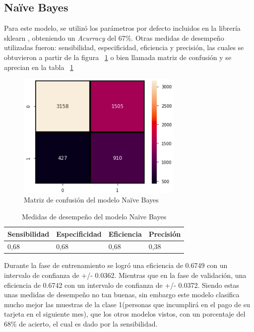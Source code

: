 \documentclass[conference]{IEEEtran}
\begin{document}
\subsection{Naïve Bayes}
Para este modelo, se utilizó los parámetros por defecto incluidos en la librería sklearn \cite{sklearnGaussian}, obteniendo un \textit{Acurracy} del 67\%. Otras medidas de desempeño utilizadas fueron: sensibilidad, especificidad, eficiencia y precisión, las cuales se obtuvieron a partir de la figura ~\ref{fig:confusionMatrizGNB} o bien llamada matriz de confusión y se aprecian en la tabla  ~\ref{tab:medidasGNB}
\begin{center}
    \begin{figure}[H]
        \hfill
     \centerline{\includegraphics[width=8cm]{matrixConfusionGNB.png}}
    \caption{Matriz de confusión del modelo Naïve Bayes}
    \label{fig:confusionMatrizGNB}
    \end{figure}  
\end{center}
\begin{table}[H]
\centering
\begin{tabular}{|l|l|l|l|}
\hline
Sensibilidad & Especificidad & \multicolumn{1}{r|}{Eficiencia} & Precisión \\ \hline
0,68         & 0,68          & 0,68                            & 0,38      \\ \hline
\end{tabular}
\caption{Medidas de desempeño del modelo Naïve Bayes}
\label{tab:medidasGNB}
\end{table}
Durante la fase de entrenamiento se logró una eficiencia de 0.6749 con un intervalo de confianza de +/- 0.0362. Mientras que en la fase de validación, una eficiencia de 0.6742 con un intervalo de confianza de +/-  0.0372. Siendo estas unas medidas de desempeño no tan buenas, sin embargo este modelo clasifica mucho mejor las muestras de la clase 1(personas que incumplirá en el pago de su tarjeta en el siguiente mes), que los otros modelos vistos, con un porcentaje del 68\% de acierto, el cual es dado por la sensibilidad.
\end{document}
